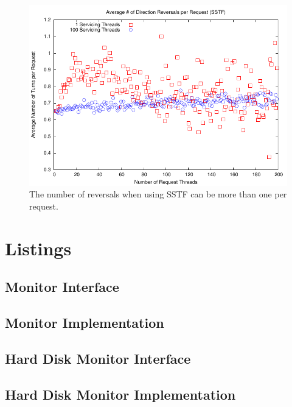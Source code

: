 \documentclass{report}
\begin{document}
\begin{figure}[htb!]
    \centering
    \includegraphics[scale=1]{turnsSSTF.pdf}
    \caption{The number of reversals when using SSTF can be more than one per request.}
    \label{fig:turnsSSTF}
\end{figure}


\newpage
\section{Listings} %
\subsection{Monitor Interface}

\subsection{Monitor Implementation}

\subsection{Hard Disk Monitor Interface}

\subsection{Hard Disk Monitor Implementation}

\end{document}
